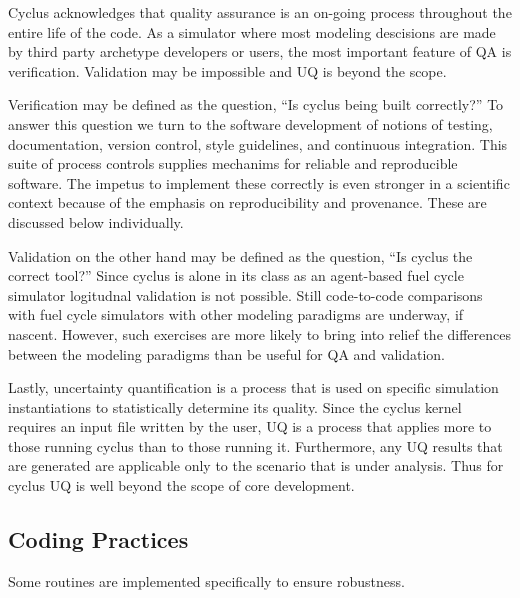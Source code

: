 Cyclus acknowledges that quality assurance is an on-going process throughout the 
entire life of the code. As a simulator where most modeling descisions are made 
by third party archetype developers or users, the most important feature of QA 
is verification. Validation may be impossible and UQ is beyond the scope.

Verification may be defined as the question, ``Is cyclus being built correctly?'' 
To answer this question we turn to the software development of notions of testing,
documentation, version control, style guidelines, and continuous integration. 
This suite of process controls supplies mechanims for reliable and reproducible 
software. The impetus to implement these correctly is even stronger in a scientific 
context because of the emphasis on reproducibility and provenance. These are 
discussed below individually.

Validation on the other hand may be defined as the question, 
``Is cyclus the correct tool?''
Since cyclus is alone in its class as an agent-based fuel cycle simulator logitudnal 
validation is not possible. Still code-to-code comparisons with fuel cycle
simulators with other modeling paradigms are underway, if nascent. However, such 
exercises are more likely to bring into relief the differences between the modeling
paradigms than be useful for QA and validation. 

Lastly, uncertainty quantification is a process that is used on specific simulation
instantiations to statistically determine its quality. Since the cyclus 
kernel requires an input file written by the user, UQ is a process that applies 
more to those running cyclus than to those running it.  Furthermore, any UQ
results that are generated are applicable only to the scenario that is under 
analysis. Thus for cyclus UQ is well beyond the scope of core development.



\subsection{Coding Practices}

Some routines are implemented specifically to ensure robustness.

